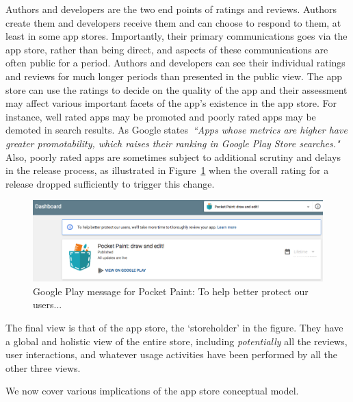 Authors and developers are the two end points of ratings and reviews. Authors create them and developers receive them and can choose to respond to them, at least in some app stores.
Importantly, their primary communications goes via the app store, rather than being direct, and aspects of these communications are often public for a period. Authors and developers can see their individual ratings and reviews for much longer periods than presented in the public view. The app store can use the ratings to decide on the quality of the app and their assessment may affect various important facets of the app's existence in the app store. For instance, well rated apps may be promoted and poorly rated apps may be demoted in search results. As Google states~\emph{``Apps whose metrics are higher have greater promotability, which raises their ranking in Google Play Store searches."}~ Also, poorly rated apps are sometimes subject to additional scrutiny and delays in the release process, as illustrated in Figure~\ref{fig:pocketpaint-to-help-better-protect-users} when the overall rating for a release dropped sufficiently to trigger this change. 

\begin{figure}
    \includegraphics[width=\linewidth]{images/android-vitals-screenshots/catrobat/pocketpaint-to-help-better-protect-users.pdf}
    \caption{Google Play message for Pocket Paint: To help better protect our users...}
    \label{fig:pocketpaint-to-help-better-protect-users}
\end{figure}

The final view is that of the app store, the `storeholder' in the figure. They have a global and holistic view of the entire store, including \emph{potentially} all the reviews, user interactions, and whatever usage activities have been performed by all the other three views. 

We now cover various implications of the app store conceptual model.

